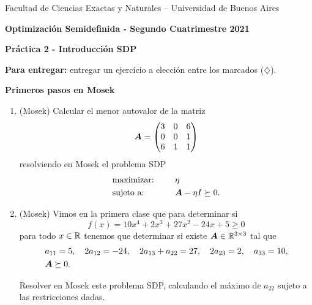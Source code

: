 \documentclass[11pt]{article}
\begin{document}
\begin{center}

{\small Facultad de Ciencias Exactas
y Naturales -- Universidad de Buenos Aires } \vskip 1cm

\textbf{{\large Optimización Semidefinida} - Segundo Cuatrimestre 2021}

\medskip\textbf{Pr\'actica 2 - Introducción SDP}
\end{center}

\medskip

\textbf{Para entregar:} entregar un ejercicio a elección entre los marcados ($\diamondsuit$).

\vspace{0.5cm}

\noindent \textbf{Primeros pasos en Mosek}

\begin{enumerate}

\item (Mosek) Calcular el menor autovalor de la matriz
$$
\bm{A} = \begin{pmatrix}
3 & 0 & 6 \\
0 & 0 & 1 \\
6 & 1 & 1
\end{pmatrix}
$$
resolviendo en Mosek el problema SDP
\begin{alignat*}{2}
  & \text{maximizar: } & & \eta \\
  & \text{sujeto a: } & \quad & \bm{A} - \eta I  \succeq 0.
\end{alignat*}

\item (Mosek)
Vimos en la primera clase que para determinar si
$$f(x) = 10x^4+2x^3+27x^2-24x+5 \ge 0$$
 para todo $x \in \mathbb{R}$ tenemos que determinar si existe $\bm{A} \in \mathbb{R}^{3 \times 3}$ tal que
\begin{align*}
&a_{11} = 5, \quad 2a_{12} = -24, \quad 2a_{13} + a_{22} = 27, \quad 2a_{23} = 2, \quad a_{33} = 10, \\
&\bm{A} \succeq 0.
\end{align*}

Resolver en Mosek este problema SDP, calculando el máximo de $a_{22}$ sujeto a las restricciones dadas.

\end{enumerate}
\end{document}
